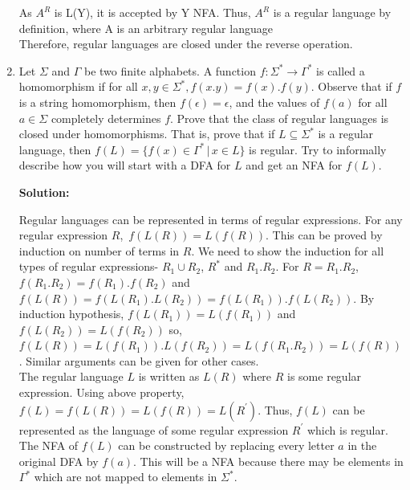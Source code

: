 \documentclass[11pt]{article}
\begin{document}
\begin{enumerate}[1.]
    As $A^R$ is L(Y), it is accepted by Y NFA. Thus, $A^R$ is a regular language by definition, where A is an arbitrary regular language \\
    
    Therefore, regular languages are closed under the reverse operation.\\
    
    
    \item Let $\Sigma$ and $\Gamma$ be two finite alphabets. A function $f : \Sigma^* \rightarrow \Gamma^*$ is called a homomorphism if for all $x, y \in \Sigma^*, f(x . y) = f(x) . f(y)$. Observe that if $f$ is a string homomorphism, then $f(\epsilon) = \epsilon$, and the values of $f(a)$ for all $a \in \Sigma$ completely determines $f$. Prove that the class of regular languages is closed under homomorphisms. That is, prove that if $L \subseteq \Sigma^*$ is a regular language, then $f(L) = \{f(x) \in \Gamma^* \,|\, x \in L\}$ is regular. Try to informally describe how you will start with a DFA for $L$ and get an NFA for $f(L)$.
    
    \textbf{Solution:}
    
    Regular languages can be represented in terms of regular expressions. For any regular expression $R$,\, $f(L(R)) = L(f(R))$. This can be proved by induction on number of terms in $R$. We need to show the induction for all types of regular expressions- $R_1 \cup R_2$, $R^*$ and $R_1.R_2$. For $R = R_1.R_2$, $f(R_1.R_2) = f(R_1).f(R_2)$ and $f(L(R)) = f(L(R_1).L(R_2)) = f(L(R_1)).f(L(R_2))$. By induction hypothesis, $f(L(R_1)) = L(f(R_1))$ and $f(L(R_2)) = L(f(R_2))$ so, $f(L(R)) = L(f(R_1)).L(f(R_2)) = L(f(R_1.R_2)) = L(f(R))$. Similar arguments can be given for other cases.\\
    The regular language $L$ is written as $L(R)$ where $R$ is some regular expression. Using above property, ${f(L) = f(L(R)) = L(f(R)) = L(R^{'} )}$. Thus, $f(L)$ can be represented as the language of some regular expression $R^{'}$ which is regular.\\
    The NFA of $f(L)$ can be constructed by replacing every letter $a$ in the original DFA by $f(a)$. This will be a NFA because there may be elements in $\Gamma^*$ which are not mapped to elements in $\Sigma^*$. 
    
\end{enumerate}
\end{document}

